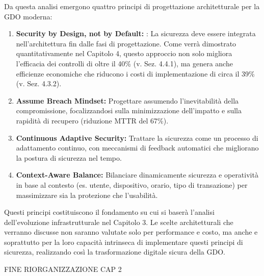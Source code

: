 Da questa analisi emergono quattro principi di progettazione architetturale per la GDO moderna:
\begin{enumerate}
    \item \textbf{Security by Design, not by Default: }: La sicurezza deve essere integrata nell'architettura fin dalle fasi di progettazione. Come verrà dimostrato quantitativamente nel Capitolo 4, questo approccio non solo migliora l'efficacia dei controlli di oltre il 40\% (v. Sez. 4.4.1), ma genera anche efficienze economiche che riducono i costi di implementazione di circa il 39\% (v. Sez. 4.3.2).
 
    \item \textbf{Assume Breach Mindset:} Progettare assumendo l'inevitabilità della compromissione, focalizzandosi sulla minimizzazione dell'impatto e sulla rapidità di recupero (riduzione MTTR del 67\%).
   
    \item \textbf{Continuous Adaptive Security:} Trattare la sicurezza come un processo di adattamento continuo, con meccanismi di feedback automatici che migliorano la postura di sicurezza nel tempo.
 
    \item \textbf{Context-Aware Balance:} Bilanciare dinamicamente sicurezza e operatività in base al contesto (es. utente, dispositivo, orario, tipo di transazione) per massimizzare sia la protezione che l'usabilità.
\end{enumerate}

Questi principi costituiscono il fondamento su cui si baserà l'analisi dell'evoluzione infrastrutturale nel Capitolo 3. Le scelte architetturali che verranno discusse non saranno valutate solo per performance e costo, ma anche e soprattutto per la loro capacità intrinseca di implementare questi principi di sicurezza, realizzando così la trasformazione digitale sicura della GDO.

FINE RIORGANIZZAZIONE CAP 2
















